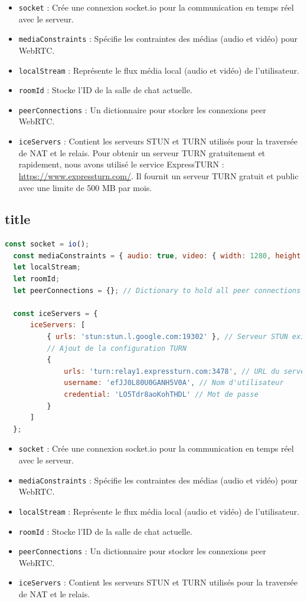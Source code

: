 \documentclass[12pt, a4paper, oneside]{Thesis}
\begin{document}
\begin{itemize}
  \item \verb|socket| : Crée une connexion socket.io pour la communication en temps réel avec le serveur.
  \item \verb|mediaConstraints| : Spécifie les contraintes des médias (audio et vidéo) pour WebRTC.
  \item \verb|localStream| : Représente le flux média local (audio et vidéo) de l'utilisateur.
  \item \verb|roomId| : Stocke l'ID de la salle de chat actuelle.
  \item \verb|peerConnections| : Un dictionnaire pour stocker les connexions peer WebRTC.
  \item \verb|iceServers| : Contient les serveurs STUN et TURN utilisés pour la traversée de NAT et le relais.
    \subitem Pour obtenir un serveur TURN gratuitement et rapidement, nous avons utilisé le service ExpressTURN : \href{https://www.expressturn.com/}{https://www.expressturn.com/}. Il fournit un serveur TURN gratuit et public avec une limite de 500 MB par mois.\\
\end{itemize}

\newpage

\subsection{title}

\begin{lstlisting}[language=JavaScript, caption={Variables}, label=Variables]
  const socket = io();
  const mediaConstraints = { audio: true, video: { width: 1280, height: 720 } };
  let localStream;
  let roomId;
  let peerConnections = {}; // Dictionary to hold all peer connections
  
  const iceServers = {
      iceServers: [
          { urls: 'stun:stun.l.google.com:19302' }, // Serveur STUN existant
          // Ajout de la configuration TURN
          {
              urls: 'turn:relay1.expressturn.com:3478', // URL du serveur TURN
              username: 'efJJ0L80U0GANH5V0A', // Nom d'utilisateur
              credential: 'LO5Tdr8aoKohTHDL' // Mot de passe
          }
      ]
  };
\end{lstlisting}

\begin{itemize}
  \item \verb|socket| : Crée une connexion socket.io pour la communication en temps réel avec le serveur.
  \item \verb|mediaConstraints| : Spécifie les contraintes des médias (audio et vidéo) pour WebRTC.
  \item \verb|localStream| : Représente le flux média local (audio et vidéo) de l'utilisateur.
  \item \verb|roomId| : Stocke l'ID de la salle de chat actuelle.
  \item \verb|peerConnections| : Un dictionnaire pour stocker les connexions peer WebRTC.
  \item \verb|iceServers| : Contient les serveurs STUN et TURN utilisés pour la traversée de NAT et le relais.
\end{itemize}
\end{document}
